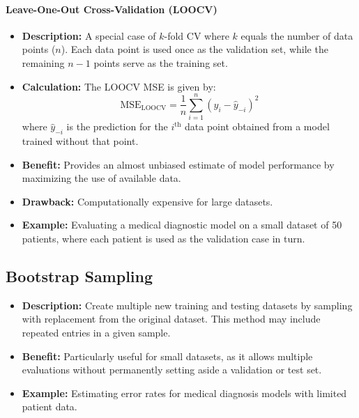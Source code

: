 \documentclass[11pt]{article}
\begin{document}
\paragraph{Leave-One-Out Cross-Validation (LOOCV)}
\begin{itemize}
    \item \textbf{Description:} A special case of $k$-fold CV where $k$ equals the number of data points ($n$). Each data point is used once as the validation set, while the remaining $n-1$ points serve as the training set.
    \item \textbf{Calculation:} The LOOCV MSE is given by:
    \[
    \text{MSE}_{\text{LOOCV}} = \frac{1}{n} \sum_{i=1}^n (y_i - \hat{y}_{-i})^2
    \]
    where $\hat{y}_{-i}$ is the prediction for the $i^{\text{th}}$ data point obtained from a model trained without that point.
    \item \textbf{Benefit:} Provides an almost unbiased estimate of model performance by maximizing the use of available data.
    \item \textbf{Drawback:} Computationally expensive for large datasets.
    \item \textbf{Example:} Evaluating a medical diagnostic model on a small dataset of 50 patients, where each patient is used as the validation case in turn.
\end{itemize}

\subsection{Bootstrap Sampling}
\begin{itemize}
    \item \textbf{Description:} Create multiple new training and testing datasets by sampling with replacement from the original dataset. This method may include repeated entries in a given sample.
    \item \textbf{Benefit:} Particularly useful for small datasets, as it allows multiple evaluations without permanently setting aside a validation or test set.
    \item \textbf{Example:} Estimating error rates for medical diagnosis models with limited patient data.
\end{itemize}
\end{document}
